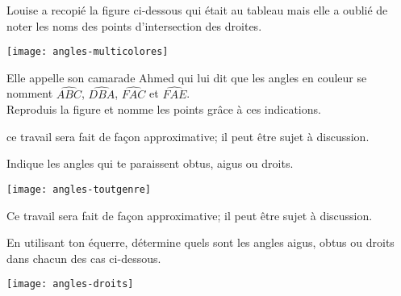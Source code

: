 \begin{exercice}
Louise a recopié la figure ci‑dessous qui était au tableau mais elle a oublié de noter les noms des points d'intersection des droites. 
 \begin{center} \texttt{[image: angles-multicolores]}  \end{center}
Elle appelle son camarade Ahmed qui lui dit que les angles en couleur se nomment $\widehat{ABC}$, $\widehat{DBA}$, $\widehat{FAC}$ et $\widehat{FAE}$. \\[0.5em]
Reproduis la figure et nomme les points grâce à ces indications.
\end{exercice}  


\vspace{3em}







\begin{exercice}
\prof
{ce travail sera fait de façon approximative; il peut être sujet à discussion.}

Indique les angles qui te paraissent obtus, aigus ou droits.
 \begin{center} \texttt{[image: angles-toutgenre]}  \end{center}
\end{exercice}


\begin{exercice}
\prof
{Ce travail sera fait de façon approximative; il peut être sujet à discussion.}

En utilisant ton équerre, détermine quels sont les angles aigus, obtus ou droits dans chacun des cas ci-dessous.
 \begin{center} \texttt{[image: angles-droits]}  \end{center}
\end{exercice}

\newpage

